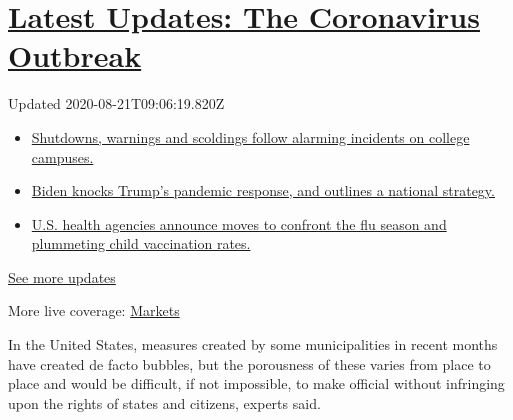 \hypertarget{latest-updates-the-coronavirus-outbreak}{%
\section{\texorpdfstring{\href{https://www.nytimes3xbfgragh.onion/2020/08/20/world/coronavirus-covid.html?action=click\&pgtype=Article\&state=default\&region=MAIN_CONTENT_1\&context=storylines_live_updates}{Latest
Updates: The Coronavirus
Outbreak}}{Latest Updates: The Coronavirus Outbreak}}\label{latest-updates-the-coronavirus-outbreak}}

Updated 2020-08-21T09:06:19.820Z

\begin{itemize}
\tightlist
\item
  \href{https://www.nytimes3xbfgragh.onion/2020/08/20/world/coronavirus-covid.html?action=click\&pgtype=Article\&state=default\&region=MAIN_CONTENT_1\&context=storylines_live_updates\#link-68774d88}{Shutdowns,
  warnings and scoldings follow alarming incidents on college campuses.}
\item
  \href{https://www.nytimes3xbfgragh.onion/2020/08/20/world/coronavirus-covid.html?action=click\&pgtype=Article\&state=default\&region=MAIN_CONTENT_1\&context=storylines_live_updates\#link-26b58724}{Biden
  knocks Trump's pandemic response, and outlines a national strategy.}
\item
  \href{https://www.nytimes3xbfgragh.onion/2020/08/20/world/coronavirus-covid.html?action=click\&pgtype=Article\&state=default\&region=MAIN_CONTENT_1\&context=storylines_live_updates\#link-4e542da3}{U.S.
  health agencies announce moves to confront the flu season and
  plummeting child vaccination rates.}
\end{itemize}

\href{https://www.nytimes3xbfgragh.onion/2020/08/20/world/coronavirus-covid.html?action=click\&pgtype=Article\&state=default\&region=MAIN_CONTENT_1\&context=storylines_live_updates}{See
more updates}

More live coverage:
\href{https://www.nytimes3xbfgragh.onion/live/2020/08/20/business/stock-market-today-coronavirus?action=click\&pgtype=Article\&state=default\&region=MAIN_CONTENT_1\&context=storylines_live_updates}{Markets}

In the United States, measures created by some municipalities in recent
months have created de facto bubbles, but the porousness of these varies
from place to place and would be difficult, if not impossible, to make
official without infringing upon the rights of states and citizens,
experts said.

